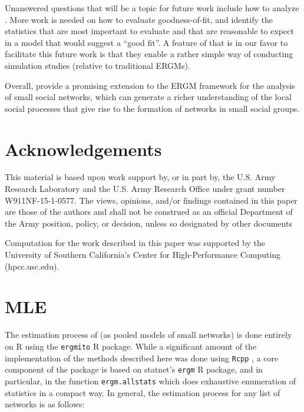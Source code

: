\documentclass[12pt]{article}
\begin{document}
Unanswered questions that will be a topic for future work include how to analyze \ergmitos{}. More work is needed on how to evaluate goodness-of-fit, and identify the statistics that are most important to evaluate and that are reasonable to expect in a model that would suggest a ``good fit''. A feature of  \ergmitos{} that is in our favor to facilitate this future work is that they enable a rather simple way of conducting simulation studies (relative to traditional ERGMs).

Overall,  \ergmitos{} provide a promising extension to the ERGM framework for the analysis of small social networks, which can generate a richer understanding of the local social processes that give rise to the formation of networks in small social groups. 

\section{Acknowledgements}

This material is based upon work support by, or in part by, the U.S. Army Research Laboratory and the U.S. Army Research Office under grant number W911NF-15-1-0577. The views, opinions, and/or findings contained in this paper are those of the authors and shall not be construed as an official Department of the Army position, policy, or decision, unless so designated by other documents

Computation for the work described in this paper was supported by the University of Southern California’s Center for High-Performance Computing (hpcc.usc.edu).

\clearpage


\nocite{vegayon2019,R,butts2016,Wickham2016,Leifeld2013}


\clearpage

\appendix

\section{MLE\label{appendix:mle}}

The estimation process of \ergmitos{} (as pooled models of small networks) is done entirely on R using the \texttt{ergmito} R package. While a significant amount of the implementation of the methods described here was done using \texttt{Rcpp} \cite{Eddelbuettel2011}, a core component of the package is based on statnet's \texttt{ergm} R package, and in particular, in the function \texttt{ergm.allstats} which does exhaustive enumeration of statistics in a compact way. In general, the estimation process for any list of networks is as follows:
\end{document}
